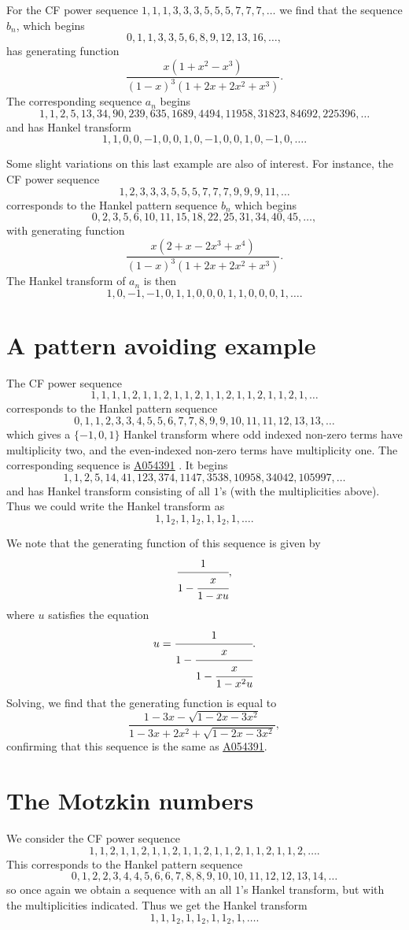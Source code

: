 \documentclass[12pt,reqno]{article}
\theoremstyle{definition}
\newcommand{\seqnum}[1]{\href{http://oeis.org/#1}{\underline{#1}}}
\begin{document}
For the CF power sequence $1,1,1,3,3,3,5,5,5,7,7,7,\ldots$  we find that the sequence $b_n$, which begins 
$$0,1, 1, 3, 3, 5, 6, 8, 9, 12, 13, 16,\ldots,$$ has generating function 
$$\frac{x(1+x^2-x^3)}{(1-x)^3 (1+2x+2x^2+x^3)}.$$ The corresponding sequence $a_n$ begins 
$$ 1, 1, 2, 5, 13, 34, 90, 239, 635, 1689, 4494, 11958, 31823, 84692, 225396, \ldots$$ and has Hankel transform 
$$1, 1, 0, 0, -1, 0, 0, 1, 0, -1, 0, 0, 1, 0, -1, 0,\ldots. $$

\noindent Some slight variations on this last example are also of interest. For instance, the CF power sequence 
$$1, 2, 3, 3, 3, 5, 5, 5, 7, 7, 7, 9, 9, 9, 11, \ldots$$ corresponds to the Hankel pattern sequence $b_n$ which begins 
$$0, 2, 3, 5, 6, 10, 11, 15, 18, 22, 25, 31, 34, 40, 45,\ldots,$$ with generating function 
$$\frac{x(2+x-2x^3+x^4)}{(1-x)^3(1+2x+2x^2+x^3)}.$$ The Hankel transform of $a_n$ is then 
$$1, 0, -1, -1, 0, 1, 1, 0, 0, 0, 1, 1, 0, 0, 0, 1,\ldots.$$ 

\section{A pattern avoiding example} The CF power sequence $$1, 1, 1, 1, 2, 1, 1, 2, 1, 1, 2, 1, 1, 2, 1, 1, 2, 1, 1, 2, 1,\ldots $$ corresponds to the Hankel pattern sequence $$0, 1, 1, 2, 3, 3, 4, 5, 5, 6, 7, 7, 8, 9, 9, 10, 11, 11, 12, 13, 13, \ldots $$ which gives a $\{-1,0,1\}$ Hankel transform where odd indexed non-zero terms have multiplicity two, and the even-indexed non-zero terms have multiplicity one.
The corresponding sequence is \seqnum{A054391} \cite{Mansour_Shattuck}. It begins
$$1, 1, 2, 5, 14, 41, 123, 374, 1147, 3538, 10958, 34042, 105997, \ldots$$  and  has Hankel transform consisting of all $1$'s (with the multiplicities above). Thus we could write the Hankel transform as
$$1,1_2,1,1_2,1,1_2,1,\ldots.$$

We note that the generating function of this sequence is given by
$$\cfrac{1}{1-
\cfrac{x}{1-x u}},$$ where $u$ satisfies the equation
$$u=\cfrac{1}{1-\cfrac{x}{1-\cfrac{x}{1-x^2 u}}}.$$
Solving, we find that the generating function is equal to
$$\frac{1-3x-\sqrt{1-2x-3x^2}}{1-3x+2x^2+\sqrt{1-2x-3x^2}}, $$ confirming that this sequence is the same as \seqnum{A054391}.

\section{The Motzkin numbers} We consider the CF power sequence
$$ 1, 1, 2, 1, 1, 2, 1, 1, 2, 1, 1, 2, 1, 1, 2, 1, 1, 2, 1, 1, 2, \ldots.$$ This corresponds to the Hankel pattern sequence
$$0, 1, 2, 2, 3, 4, 4, 5, 6, 6, 7, 8, 8, 9, 10, 10, 11, 12, 12, 13, 14, \ldots $$ so once again we obtain a sequence with an
all $1$'s Hankel transform, but with the multiplicities indicated. Thus we get the Hankel transform
$$1,1,1_2,1,1_2,1,1_2,1,\ldots.$$
\end{document}
